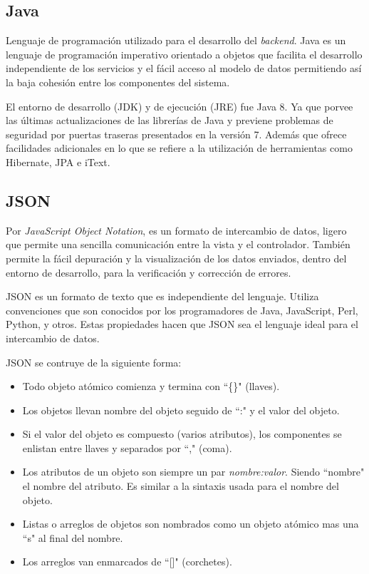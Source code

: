         \subsection{Java}
        \label{tecno-java}
        
        Lenguaje de programación utilizado para el desarrollo del \textit{backend}. Java es un lenguaje de programación imperativo orientado a objetos que facilita el desarrollo independiente de los servicios y el fácil acceso al modelo de datos permitiendo así la baja cohesión entre los componentes del sistema.
        
        El entorno de desarrollo (JDK) y de ejecución (JRE) fue Java 8. Ya que porvee las últimas actualizaciones de las librerías de Java y previene problemas de seguridad por puertas traseras presentados en la versión 7. Además que ofrece facilidades adicionales en lo que se refiere a la utilización de herramientas como Hibernate, JPA e iText.
        
        \subsection{JSON}
        \label{tecno-json}
        
        Por \textit{JavaScript Object Notation}, es un formato de intercambio de datos, ligero\cite{JSON-yahoo} que permite una sencilla comunicación entre la vista y el controlador. También permite la fácil depuración y la visualización de los datos enviados, dentro del entorno de desarrollo, para la verificación y corrección de errores.
        
        JSON es un formato de texto que es independiente del lenguaje. Utiliza convenciones que son  conocidos por los programadores de Java, JavaScript, Perl, Python, y otros. Estas propiedades hacen que JSON sea el lenguaje ideal para el intercambio de datos\cite{JSON-jsonOrg}.
        
        JSON se contruye de la siguiente forma:
        
        \begin{itemize}
            \item Todo objeto atómico comienza y termina con ``\{\}" (llaves).
            \item Los objetos llevan nombre del objeto seguido de ``:" y el valor del objeto.
            \item Si el valor del objeto es compuesto (varios atributos), los componentes se enlistan entre llaves y separados por ``," (coma).
            \item Los atributos de un objeto son siempre un par \textit{nombre:valor}. Siendo ``nombre" el nombre del atributo. Es similar a la sintaxis usada para el nombre del objeto.
            \item Listas o arreglos de objetos son nombrados como un objeto atómico mas una ``s" al final del nombre.
            \item Los arreglos van enmarcados de ``[]" (corchetes).
        \end{itemize}
        
